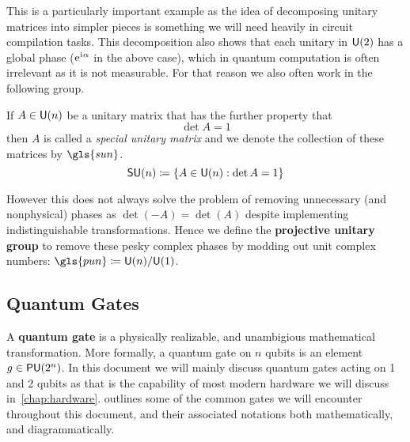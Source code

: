 This is a particularly important example as the idea of decomposing unitary matrices into simpler pieces is something we will need heavily in circuit compilation tasks.
This decomposition also shows that each unitary in $\mathsf{U} (2)$ has a global phase ($\mathrm{e}^{\mkern1mu\mathrm{i}\mkern1mu\alpha}$ in the above case), which in quantum computation is often irrelevant as it is not measurable.
For that reason we also often work in the following group.
\begin{definition}
    If $A \in \mathsf{U} (n)$ be a unitary matrix that has the further property that
    \begin{equation}
        \det A = 1
    \end{equation}
    then $A$ is called a \emph{special unitary matrix} and we denote the collection of these matrices by $\gls{sun}$.
    \begin{equation}
        \mathsf{SU} (n) \coloneqq \qty{ A \in \mathsf{U} (n) : \det A = 1}
    \end{equation}
\end{definition}
However this does not always solve the problem of removing unnecessary (and nonphysical) phases as $\det(-A) = \det(A)$ despite implementing indistinguishable transformations.
Hence we define the \textbf{projective unitary group} to remove these pesky complex phases by modding out unit complex numbers: $\gls{pun} \defeq \U{n} / \U{1}$. %

\subsection{Quantum Gates}

A \textbf{quantum gate} is a physically realizable, and unambigious mathematical transformation.
More formally, a quantum gate on $n$ qubits is an element $g \in \mathsf{PU} (2^n)$.
In this document we will mainly discuss quantum gates acting on 1 and 2 qubits as that is the capability of most modern hardware we will discuss in~\cref{chap:hardware}.
 outlines some of the common gates we will encounter throughout this document, and their associated notations both mathematically, and diagrammatically.


